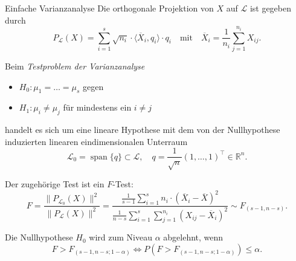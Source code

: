 \begin{defi}{Einfache Varianzanalyse}
    Die orthogonale Projektion von $X$ auf $\mathcal{L}$ ist gegeben durch
    \[
        P_{\mathcal{L}}(X) = \sum_{i = 1}^{s} \sqrt{n_i} \cdot \langle \overline{X}_i, q_i \rangle \cdot q_i \quad \text{mit} \quad \overline{X}_i = \frac{1}{n_i} \sum_{j = 1}^{n_i} X_{ij}.
    \]

    Beim \emph{Testproblem der Varianzanalyse}
    \begin{itemize}
        \item $H_0: \mu_1 = \ldots = \mu_s$ gegen
        \item $H_1: \mu_i \neq \mu_j$ für mindestens ein $i \neq j$
    \end{itemize}
    handelt es sich um eine lineare Hypothese mit dem von der Nullhypothese induzierten linearen eindimensionalen Unterraum
    \[
        \mathcal{L}_0 = \operatorname{span} \{ q \} \subset \mathcal{L}, \quad q = \frac{1}{\sqrt{n}} (1, \ldots, 1)^{\top} \in \mathbb{R}^n.
    \]

    Der zugehörige Test ist ein $F$-Test:
    \[
        F = \frac{\| P_{\mathcal{L}_0}(X) \|^2}{\| P_{\mathcal{L}}(X) \|^2} = \frac{\frac{1}{s-1} \sum_{i = 1}^{s} n_i \cdot (\overline{X}_i - \overline{X})^2}{\frac{1}{n - s} \sum_{i = 1}^{s} \sum_{j = 1}^{n_i} (X_{ij} - \overline{X}_i)^2} \sim F_{(s - 1, n - s)}.
    \]

    Die Nullhypothese $H_0$ wird zum Niveau $\alpha$ abgelehnt, wenn
    \[
        F > F_{(s - 1, n - s; 1 - \alpha)} \iff P(F > F_{(s - 1, n - s; 1 - \alpha)}) \leq \alpha.
    \]
\end{defi}

